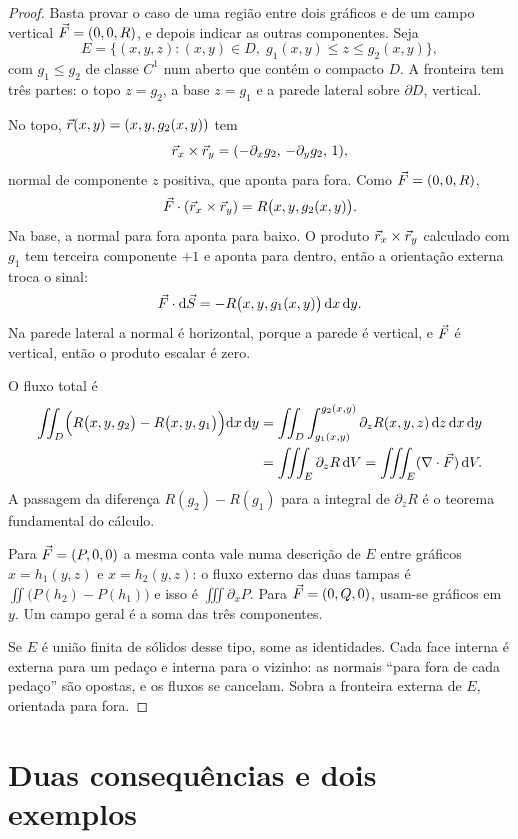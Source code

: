 \documentclass[11pt,a4paper]{article}
\begin{document}
\begin{proof}
Basta provar o caso de uma região entre dois gráficos e de um campo vertical $\vec{F}=(0,0,R)$, e depois indicar as outras componentes. Seja
\[
E=\bigl\{(x,y,z):(x,y)\in D,\; g_1(x,y)\le z\le g_2(x,y)\bigr\},
\]
com $g_1\le g_2$ de classe $C^1$ num aberto que contém o compacto $D$. A fronteira tem três partes: o topo $z=g_2$, a base $z=g_1$ e a parede lateral sobre $\partial D$, vertical.

No topo, $\vec{r}(x,y)=(x,y,g_2(x,y))$ tem
\[
\vec{r}_x\times\vec{r}_y=(-\partial_x g_2,\,-\partial_y g_2,\,1),
\]
normal de componente $z$ positiva, que aponta para fora. Como $\vec{F}=(0,0,R)$,
\[
\vec{F}\cdot(\vec{r}_x\times\vec{r}_y)=R\bigl(x,y,g_2(x,y)\bigr).
\]
Na base, a normal para fora aponta para baixo. O produto $\vec{r}_x\times\vec{r}_y$ calculado com $g_1$ tem terceira componente $+1$ e aponta para dentro, então a orientação externa troca o sinal:
\[
\vec{F}\cdot\mathrm{d}\vec{S}=-R\bigl(x,y,g_1(x,y)\bigr)\,\mathrm{d} x\,\mathrm{d} y.
\]
Na parede lateral a normal é horizontal, porque a parede é vertical, e $\vec{F}$ é vertical, então o produto escalar é zero.

O fluxo total é
\begin{align*}
\iint_D\Bigl(R\bigl(x,y,g_2\bigr)-R\bigl(x,y,g_1\bigr)\Bigr)\mathrm{d} x\,\mathrm{d} y
&=\iint_D\int_{g_1(x,y)}^{g_2(x,y)}\partial_z R(x,y,z)\,\mathrm{d} z\,\mathrm{d} x\,\mathrm{d} y\\
&=\iiint_E\partial_z R\,\mathrm{d} V
=\iiint_E(\nabla\cdot\vec{F})\,\mathrm{d} V.
\end{align*}
A passagem da diferença $R(g_2)-R(g_1)$ para a integral de $\partial_z R$ é o teorema fundamental do cálculo.

Para $\vec{F}=(P,0,0)$ a mesma conta vale numa descrição de $E$ entre gráficos $x=h_1(y,z)$ e $x=h_2(y,z)$: o fluxo externo das duas tampas é $\iint\bigl(P(h_2)-P(h_1)\bigr)$ e isso é $\iiint\partial_x P$. Para $\vec{F}=(0,Q,0)$, usam-se gráficos em $y$. Um campo geral é a soma das três componentes.

Se $E$ é união finita de sólidos desse tipo, some as identidades. Cada face interna é externa para um pedaço e interna para o vizinho: as normais ``para fora de cada pedaço'' são opostas, e os fluxos se cancelam. Sobra a fronteira externa de $E$, orientada para fora.
\end{proof}

\section{Duas consequências e dois exemplos}
\end{document}
